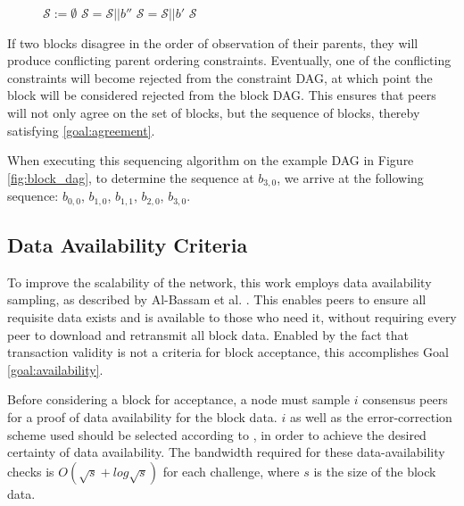 \documentclass[12pt]{article}
\begin{document}
  \begin{figure}
  \begin{center}
  \small
  \begin{algorithmic}[1]
        \State $\mathcal{S} := \emptyset$
            \State $\mathcal{S} = \mathcal{S} || b''$
          \EndFor
        \EndFor
            \State $\mathcal{S} = \mathcal{S} || b'$
        \EndFor
        \State \Return $\mathcal{S}$
      \EndProcedure
       \label{alg:sequencing}
  \end{algorithmic}
  \end{center}
  \end{figure}

  If two blocks disagree in the order of observation of their parents, they
  will produce conflicting parent ordering constraints. Eventually, one of the
  conflicting constraints will become rejected from the constraint DAG, at
  which point the block will be considered rejected from the block DAG. This
  ensures that peers will not only agree on the set of blocks, but the sequence
  of blocks, thereby satisfying \ref{goal:agreement}.

  When executing this sequencing algorithm on the example DAG in Figure
  \ref{fig:block_dag}, to determine the sequence at $b_{3,0}$, we arrive at the
  following sequence: $b_{0,0}$, $b_{1,0}$, $b_{1,1}$, $b_{2,0}$, $b_{3,0}$.

\subsection{Data Availability Criteria}
  To improve the scalability of the network, this work employs data
  availability sampling, as described by Al-Bassam et al.
  \cite{albassam2019fraud}. This enables peers to ensure all requisite data
  exists and is available to those who need it, without requiring every peer to
  download and retransmit all block data. Enabled by the fact that transaction
  validity is not a criteria for block acceptance, this accomplishes
  Goal \ref{goal:availability}.

  Before considering a block for acceptance, a node must sample $i$ consensus
  peers for a proof of data availability for the block data. $i$ as well as the
  error-correction scheme used should be selected according to
  \cite{albassam2019fraud}, in order to achieve the desired certainty of data
  availability. The bandwidth required for these data-availability checks is
  $O(\sqrt{s}+log{\sqrt{s}})$ for each challenge, where $s$ is the size of the
  block data.
\end{document}
